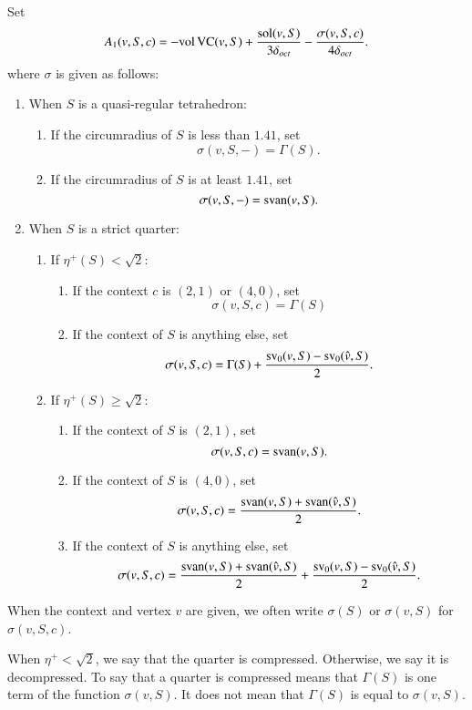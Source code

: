 \begin{definition}[$A_1$,~$\sigma$]\label{def:sigma}
Set
   \begin{equation}\label{eqn:a1-sigma}
   A_1(v,S,c) = -{\operatorname{vol}}\,{\operatorname{VC}}(v,S)+
      \frac{\operatorname{sol}(v,S)}{3\delta_{oct}} - \frac{\sigma(v,S,c)}{4\delta_{oct}}.
      \end{equation}  where $\sigma$ is given as follows:
\begin{enumerate}
\item When $S$ is a quasi-regular tetrahedron:
   \begin{enumerate}
      \item If the circumradius of $S$ is less than $1.41$, set
         $$\sigma(v,S,-)=\Gamma(S).$$
      \item If the circumradius of $S$ is at least $1.41$, set
         $$\sigma(v,S,-)={\operatorname{svan}}(v,S).$$
   \end{enumerate}
\item When $S$ is a strict quarter:
   \begin{enumerate}
      \item If $\eta^+(S) <\sqrt2$:
         \begin{enumerate}
         \item If the context $c$ is $(2,1)$ or $(4,0)$, set
                  $$\sigma(v,S,c)=\Gamma(S)$$
         \item If the context of $S$ is anything else, set
                  $$\sigma(v,S,c)=\Gamma(S) +
                     \frac{{\operatorname{sv}}_0(v,S)
                      -{\operatorname{sv}}_0(\hat v,S)}{2}.$$
         \end{enumerate}
      \item If $\eta^+(S) \ge\sqrt2$:
         \begin{enumerate}
         \item If the context of $S$ is $(2,1)$, set
                  $$\sigma(v,S,c)={\operatorname{svan}}(v,S).$$
         \item If the context of $S$ is $(4,0)$, set
                  $$\sigma(v,S,c)=\frac{{\operatorname{svan}}(v,S)
            +{\operatorname{svan}}(\hat v,S)}{2}.$$
         \item If the context of $S$ is anything else, set
                  $$\sigma(v,S,c)=\frac{{\operatorname{svan}}(v,S)
           +{\operatorname{svan}}(\hat v,S)
                  }{2}
                     +\frac{{\operatorname{sv}}_0(v,S)-
                     {\operatorname{sv}}_0(\hat v,S)}{2}.$$
         \end{enumerate}
   \end{enumerate}
\end{enumerate}
When the context and vertex $v$ are given, we often write
$\sigma(S)$ or $\sigma(v,S)$ for $\sigma(v,S,c)$.

When $\eta^+<\sqrt2$, we say that the quarter is compressed.
Otherwise, we say it is decompressed.  To say that a quarter is
compressed means that $\Gamma(S)$ is one term of the function
$\sigma(v,S)$. It does not mean that $\Gamma(S)$ is equal to
$\sigma(v,S)$.
%
\end{definition}

